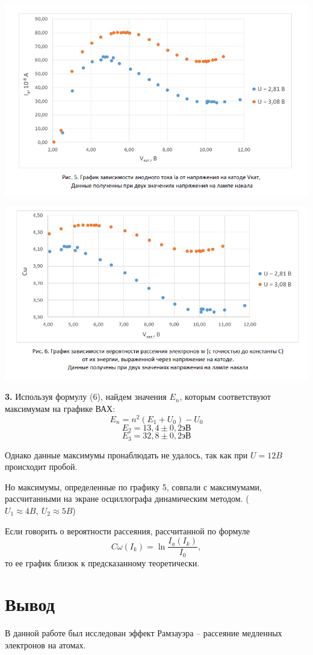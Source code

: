 \documentclass[a4paper,12pt]{article}
\begin{document}
	\includegraphics[width=\linewidth]{graph1.png}
	
	
	\includegraphics[width=\linewidth]{graph2.png}
	
	
	{\bf 3.} Используя формулу (6), найдем значения $E_n$, которым соответствуют максимумам на графике ВАХ:
	$$E_n = n^2(E_1+U_0)-U_0$$
	$$E_2 = 13,4 \pm 0,2 \text{эВ}$$
	$$E_3 = 32,8 \pm 0,2 \text{эВ}$$
	
	Однако данные максимумы пронаблюдать не удалось, так как при $U = 12B$ происходит пробой.
	
	Но максимумы, определенные по графику 5, совпали с максимумами, рассчитанными на экране осциллографа динамическим методом. ($U_1 \approx 4B, \ U_2 \approx 5B$)
	
	Если говорить о вероятности рассеяния, рассчитанной по формуле
	$$C\omega (I_k) = \ln\frac{I_a(I_k)}{I_0},$$ то ее график близок к предсказанному теоретически.
	
	\section{Вывод}
	В данной работе был исследован эффект Рамзауэра -- рассеяние медленных электронов на атомах.
	
\end{document}
